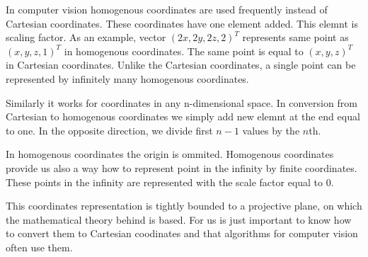 In computer vision homogenous coordinates are used frequently instead of
Cartesian coordinates.  These coordinates have one element added. This elemnt
is scaling factor. As an example, vector $(2x, 2y, 2z, 2)^T$ represents same
point as $(x, y, z, 1)^T$ in homogenous coordinates. The same point is equal to
$(x, y, z)^T$ in Cartesian coordinates. Unlike the Cartesian coordinates, a
single point can be represented by infinitely many homogenous coordinates.

Similarly it works for coordinates in any n-dimensional space. In conversion
from Cartesian to homogenous coordinates we simply add new elemnt at the end
equal to one. In the opposite direction, we divide first $n-1$ values by the
$n$th.

In homogenous coordinates the origin is ommited. Homogenous coordinates provide
us also a way how to represent point in the infinity by finite coordinates.
These points in the infinity are represented with the scale factor equal to 0.

This coordinates representation is tightly bounded to a projective plane, on
which the mathematical theory behind is based. For us is just important to know
how to convert them to Cartesian coodinates and that algorithms for computer
vision often use them.
